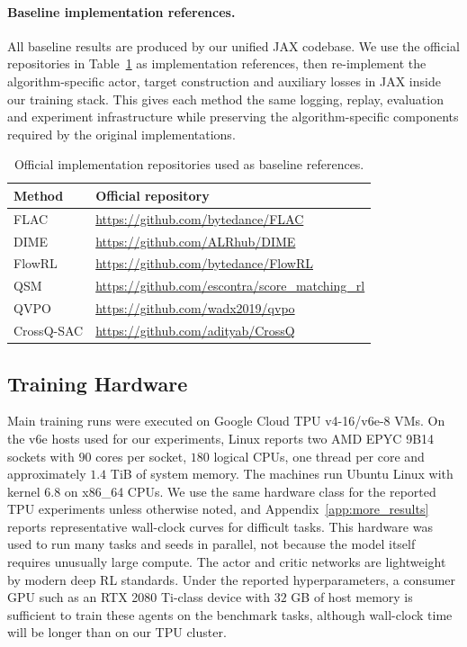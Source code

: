 \documentclass[11pt]{article}
\begin{document}
\paragraph{Baseline implementation references.}
All baseline results are produced by our unified JAX codebase. We use the official repositories in Table~\ref{tab:baseline_code_references} as implementation references, then re-implement the algorithm-specific actor, target construction and auxiliary losses in JAX inside our training stack. This gives each method the same logging, replay, evaluation and experiment infrastructure while preserving the algorithm-specific components required by the original implementations.

\begin{table}[H]
  \centering
  \footnotesize
  \setlength{\tabcolsep}{5pt}
  \caption{Official implementation repositories used as baseline references.}
  \label{tab:baseline_code_references}
  \begin{tabular}{ll}
    \toprule
    Method & Official repository \\
    \midrule
    FLAC & \url{https://github.com/bytedance/FLAC} \\
    DIME & \url{https://github.com/ALRhub/DIME} \\
    FlowRL & \url{https://github.com/bytedance/FlowRL} \\
    QSM & \url{https://github.com/escontra/score_matching_rl} \\
    QVPO & \url{https://github.com/wadx2019/qvpo} \\
    CrossQ-SAC & \url{https://github.com/adityab/CrossQ} \\
    \bottomrule
  \end{tabular}
\end{table}

\subsection{Training Hardware}
\label{app:training_hardware}

Main training runs were executed on Google Cloud TPU v4-16/v6e-8 VMs. On the v6e hosts used for our experiments, Linux reports two AMD EPYC 9B14 sockets with $90$ cores per socket, $180$ logical CPUs, one thread per core and approximately $1.4$ TiB of system memory. The machines run Ubuntu Linux with kernel 6.8 on x86\_64 CPUs. We use the same hardware class for the reported TPU experiments unless otherwise noted, and Appendix~\ref{app:more_results} reports representative wall-clock curves for difficult tasks. This hardware was used to run many tasks and seeds in parallel, not because the model itself requires unusually large compute. The actor and critic networks are lightweight by modern deep RL standards. Under the reported hyperparameters, a consumer GPU such as an RTX 2080 Ti-class device with $32$ GB of host memory is sufficient to train these agents on the benchmark tasks, although wall-clock time will be longer than on our TPU cluster.
\end{document}
